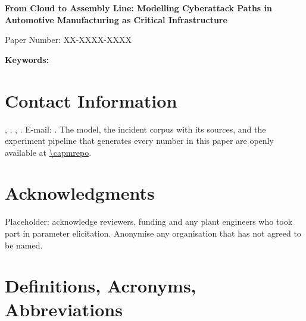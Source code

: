 \documentclass[11pt,a4paper]{article}
\begin{document}
\begin{center}
{\LARGE\bfseries From Cloud to Assembly Line: Modelling Cyberattack Paths in
Automotive Manufacturing as Critical Infrastructure\par}
\vspace{6pt}
{\normalsize Paper Number: XX-XXXX-XXXX\par}
\vspace{10pt}
{\large \capmauthor\par}
{\normalsize \capmaffiliation\par}
\end{center}
\vspace{6pt}

\begin{abstract}
\capmabstract
\end{abstract}

\vspace{6pt}
\noindent\textbf{Keywords:} \capmkeywords






\section*{Contact Information}

\capmauthor, \capmaffiliation, \capmcity, \capmcountry. E-mail: \capmemail. The model,
the incident corpus with its sources, and the experiment pipeline that generates
every number in this paper are openly available at
\url{\capmrepo}.

\section*{Acknowledgments}

Placeholder: acknowledge reviewers, funding and any plant engineers who took
part in parameter elicitation. Anonymise any organisation that has not agreed to
be named.

\section*{Definitions, Acronyms, Abbreviations}
\end{document}
